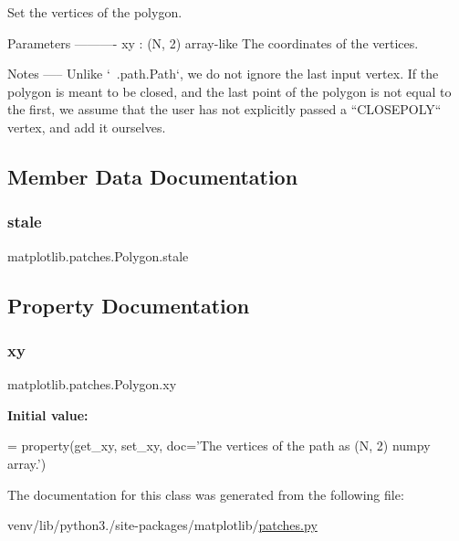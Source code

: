 \begin{DoxyVerb}Set the vertices of the polygon.

Parameters
----------
xy : (N, 2) array-like
    The coordinates of the vertices.

Notes
-----
Unlike `~.path.Path`, we do not ignore the last input vertex. If the
polygon is meant to be closed, and the last point of the polygon is not
equal to the first, we assume that the user has not explicitly passed a
``CLOSEPOLY`` vertex, and add it ourselves.
\end{DoxyVerb}
 

\subsection{Member Data Documentation}
\mbox{\label{classmatplotlib_1_1patches_1_1Polygon_aae8022e6188d979d34a6b83d1c97febf}} 
\subsubsection{\texorpdfstring{stale}{stale}}
{\footnotesize\ttfamily matplotlib.\+patches.\+Polygon.\+stale}



\subsection{Property Documentation}
\mbox{\label{classmatplotlib_1_1patches_1_1Polygon_adbcd8cb98f296fee4f52ba638b92e2e1}} 
\subsubsection{\texorpdfstring{xy}{xy}}
{\footnotesize\ttfamily matplotlib.\+patches.\+Polygon.\+xy\hspace{0.3cm}{\ttfamily [static]}}

{\bfseries Initial value\+:}
\begin{DoxyCode}
=  property(get\_xy, set\_xy,
                  doc=\textcolor{stringliteral}{'The vertices of the path as (N, 2) numpy array.'})
\end{DoxyCode}


The documentation for this class was generated from the following file\+:\begin{DoxyCompactItemize}
\item 
venv/lib/python3./site-\/packages/matplotlib/\hyperlink{patches_8py}{patches.\+py}\end{DoxyCompactItemize}
